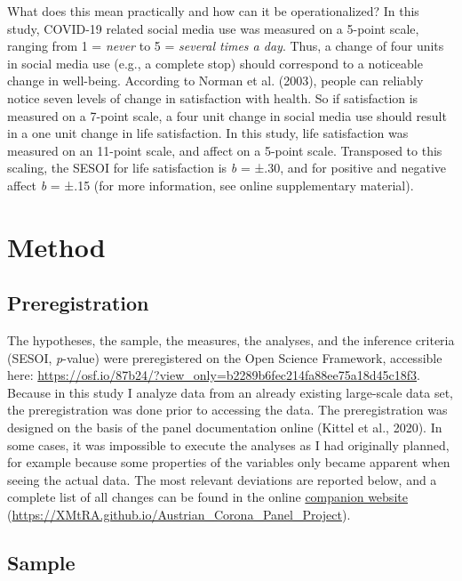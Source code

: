 \documentclass[
  man,mask,floatsintext]{apa7}
\begin{document}
What does this mean practically and how can it be operationalized?
In this study, COVID-19 related social media use was measured on a 5-point scale, ranging from 1 = \emph{never} to 5 = \emph{several times a day}. Thus, a change of four units in social media use (e.g., a complete stop) should correspond to a noticeable change in well-being.
According to Norman et al. (2003), people can reliably notice seven levels of change in satisfaction with health.
So if satisfaction is measured on a 7-point scale, a four unit change in social media use should result in a one unit change in life satisfaction.
In this study, life satisfaction was measured on an 11-point scale, and affect on a 5-point scale.
Transposed to this scaling, the SESOI for life satisfaction is \emph{b} = ±.30, and for positive and negative affect \emph{b} = ±.15 (for more information, see online supplementary material).

\hypertarget{method}{%
\section{Method}\label{method}}

\hypertarget{preregistration}{%
\subsection{Preregistration}\label{preregistration}}

The hypotheses, the sample, the measures, the analyses, and the inference criteria (SESOI, \emph{p}-value) were preregistered on the Open Science Framework, accessible here: \url{https://osf.io/87b24/?view_only=b2289b6fec214fa88ee75a18d45c18f3}.
Because in this study I analyze data from an already existing large-scale data set, the preregistration was done prior to accessing the data.
The preregistration was designed on the basis of the panel documentation online (Kittel et al., 2020).
In some cases, it was impossible to execute the analyses as I had originally planned, for example because some properties of the variables only became apparent when seeing the actual data.
The most relevant deviations are reported below, and a complete list of all changes can be found in the online \href{https://XMtRA.github.io/Austrian_Corona_Panel_Project}{companion website} (\url{https://XMtRA.github.io/Austrian_Corona_Panel_Project}).

\hypertarget{sample}{%
\subsection{Sample}\label{sample}}
\end{document}
